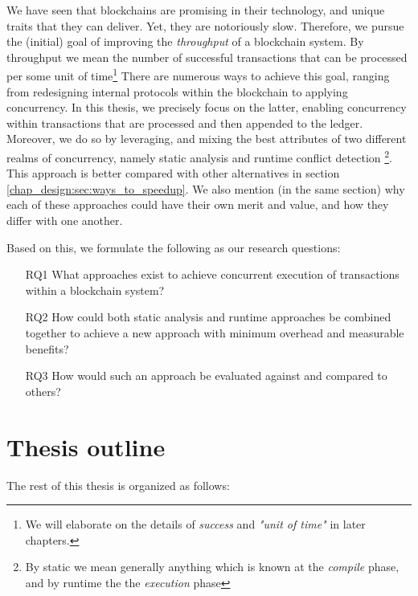 We have seen that blockchains are promising in their technology, and unique traits that they can
deliver. Yet, they are notoriously slow. Therefore, we  pursue the (initial) goal of improving the
\textit{throughput} of a blockchain system. By throughput we mean the number of successful
transactions that can be processed per some unit of time\footnote{We will elaborate on the details
of \textit{success} and \textit{"unit of time"} in later chapters.} There are numerous ways to
achieve this goal, ranging from redesigning internal protocols within the blockchain to applying
concurrency. In this thesis, we precisely focus on the latter, enabling concurrency within
transactions that are processed and then appended to the ledger. Moreover, we do so by leveraging,
and mixing the best attributes of two different realms of concurrency, namely static analysis and
runtime conflict detection \footnote{By static we mean generally anything which is known at the
\textit{compile} phase, and by runtime the the \textit{execution} phase}. This approach is better
compared with other alternatives in section \ref{chap_design:sec:ways_to_speedup}. We also mention
(in the same section) why each of these approaches could have their own merit and value, and how
they differ with one another.

Based on this, we formulate the following as our research questions:

 \begin{enumerate}
     \item [RQ1] What approaches exist to achieve concurrent execution of transactions within a
     blockchain system?
	 \item [RQ2] How could both static analysis and runtime approaches be combined together to
	 achieve a new approach with minimum overhead and measurable benefits?
	 \item [RQ3] How would such an approach be evaluated against and compared to others?
 \end{enumerate}

\section{Thesis outline}
The rest of this thesis is organized as follows: 


